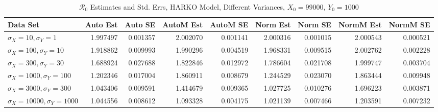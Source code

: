 \documentclass[12pt]{article}
\newcommand{\rr}{\ensuremath{\mathcal{R}_0}}
\begin{document}
\begin{table}[H]
	
	\caption{$\rr$ Estimates and Std. Errs, HARKO Model, 
		Different Variances, $X_0 = 99000$, $Y_0 = 1000$}
	\begin{footnotesize}
		\hskip -1.7cm
		\begin{tabular}{l|r|r|r|r|r|r|r|r}
			\hline
			Data Set & Auto Est & Auto SE & AutoM Est & AutoM SE & Norm Est & Norm SE & NormM Est & NormM SE\\
			\hline
			$\sigma_X = 10, \sigma_Y = 1$ & 1.997497 & 0.001357 & 2.002070 & 0.001141 & 2.000316 & 0.001015 & 2.000543 & 0.000521\\
			\hline
			$\sigma_X = 100, \sigma_Y = 10$ & 1.918862 & 0.009993 & 1.990296 & 0.004519 & 1.968331 & 0.009515 & 2.002762 & 0.002228\\
			\hline
			$\sigma_X = 300, \sigma_Y = 30$ & 1.688924 & 0.027688 & 1.822846 & 0.012972 & 1.786604 & 0.021708 & 1.999747 & 0.003704\\
			\hline
			$\sigma_X = 1000, \sigma_Y = 100$ & 1.202346 & 0.017004 & 1.860911 & 0.008679 & 1.244529 & 0.023070 & 1.863444 & 0.009948\\
			\hline
			$\sigma_X = 3000, \sigma_Y = 300$ & 1.043406 & 0.009591 & 1.414679 & 0.009365 & 1.027725 & 0.010276 & 1.696223 & 0.003871\\
			\hline
			$\sigma_X = 10000, \sigma_Y = 1000$ & 1.044556 & 0.008612 & 1.093328 & 0.004175 & 1.021139 & 0.007466 & 1.203591 & 0.007232\\
			\hline
		\end{tabular}
	\end{footnotesize}
\end{table}
\end{document}
